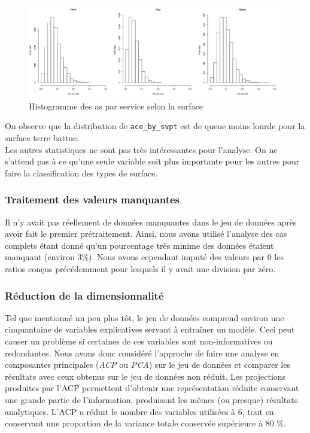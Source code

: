 \begin{figure}[H]
	\caption{Histogramme des as par service selon la surface}
	\label{fig:acebyshist}
	\includegraphics[width=\textwidth]{acebysurfacehist}
\end{figure}

On observe que la distribution de \texttt{ace\_by\_svpt} est de queue moins lourde pour la surface terre battue.\\

Les autres statistiques ne sont pas très intéressantes pour l'analyse. On ne s'attend pas à ce qu'une seule variable soit plus importante pour les autres pour faire la classification des types de surface.

\subsubsection{Traitement des valeurs manquantes}
Il n'y avait pas réellement de données manquantes dans le jeu de données après avoir fait le premier prétraitement. Ainsi, nous avons utilisé l'analyse des cas complets étant donné qu'un pourcentage très minime des données étaient manquant (environ 3\%). Nous avons cependant imputé des valeurs par 0 les ratios conçus précédemment pour lesquels il y avait une division par zéro.

\subsubsection{Réduction de la dimensionnalité}
Tel que mentionné un peu plus tôt, le jeu de données comprend environ une cinquantaine de variables explicatives servant à entraîner un modèle. Ceci peut causer un problème si certaines de ces variables sont non-informatives ou redondantes. Nous avons donc considéré l'approche de faire une analyse en composantes principales (\textit{ACP} ou \textit{PCA}) sur le jeu de données et comparer les résultats avec ceux obtenus sur le jeu de données non réduit. Les projections produites par l'ACP permettent d'obtenir une représentation réduite conservant une grande partie de l'information, produisant les mêmes (ou presque) résultats analytiques. L'ACP a réduit le nombre des variables utilisées à 6, tout en conservant une proportion de la variance totale conservée supérieure à 80 \%.

